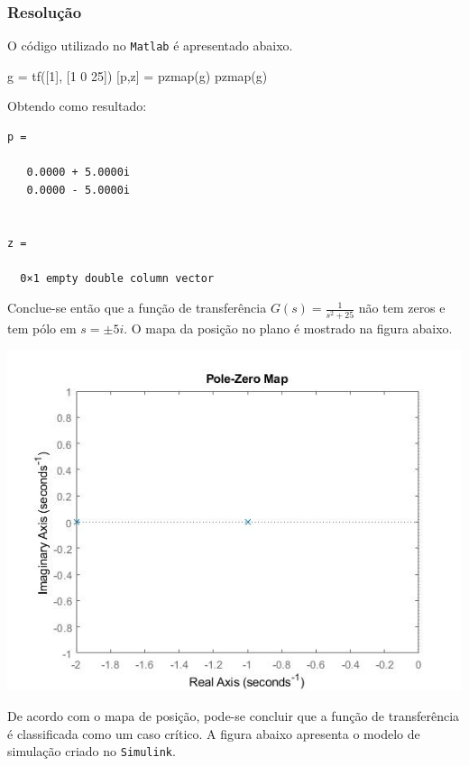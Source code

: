 \documentclass[
]{book}
\newenvironment{Shaded}{\begin{snugshade}}{\end{snugshade}}
\newcommand{\FloatTok}[1]{\textcolor[rgb]{0.00,0.00,0.81}{#1}}
\newcommand{\NormalTok}[1]{#1}
\begin{document}
\hypertarget{resoluuxe7uxe3o-2}{%
\subsubsection*{Resolução}\label{resoluuxe7uxe3o-2}}

O código utilizado no \texttt{Matlab} é apresentado abaixo.

\begin{Shaded}
\begin{Highlighting}[]
\NormalTok{g = tf([}\FloatTok{1}\NormalTok{], [}\FloatTok{1} \FloatTok{0} \FloatTok{25}\NormalTok{])}
\NormalTok{[p,z] = pzmap(g)}
\NormalTok{pzmap(g)}
\end{Highlighting}
\end{Shaded}

Obtendo como resultado:

\begin{verbatim}
p =

   0.0000 + 5.0000i
   0.0000 - 5.0000i


z =

  0×1 empty double column vector
\end{verbatim}

Conclue-se então que a função de transferência \(G(s) = \frac {1}{s^2 +25}\) não tem zeros e tem pólo em \(s = \pm 5i\). O mapa da posição no plano é mostrado na figura abaixo.

\includegraphics{Imagens/Lab2/prob3.jpg}

De acordo com o mapa de posição, pode-se concluir que a função de transferência é classificada como um caso crítico. A figura abaixo apresenta o modelo de simulação criado no \texttt{Simulink}.
\end{document}
